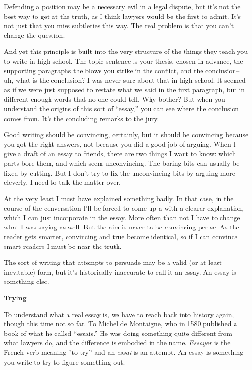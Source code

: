 Defending a position may be a necessary evil in a legal dispute, but
it's not the best way to get at the truth, as I think lawyers would be
the first to admit. It's not just that you miss subtleties this way. The
real problem is that you can't change the question.

And yet this principle is built into the very structure of the things
they teach you to write in high school. The topic sentence is your
thesis, chosen in advance, the supporting paragraphs the blows you
strike in the conflict, and the conclusion-- uh, what is the conclusion?
I was never sure about that in high school. It seemed as if we were just
supposed to restate what we said in the first paragraph, but in
different enough words that no one could tell. Why bother? But when you
understand the origins of this sort of ``essay,'' you can see where the
conclusion comes from. It's the concluding remarks to the jury.

Good writing should be convincing, certainly, but it should be
convincing because you got the right answers, not because you did a good
job of arguing. When I give a draft of an essay to friends, there are
two things I want to know: which parts bore them, and which seem
unconvincing. The boring bits can usually be fixed by cutting. But I
don't try to fix the unconvincing bits by arguing more cleverly. I need
to talk the matter over.

At the very least I must have explained something badly. In that case,
in the course of the conversation I'll be forced to come up a with a
clearer explanation, which I can just incorporate in the essay. More
often than not I have to change what I was saying as well. But the aim
is never to be convincing per se. As the reader gets smarter, convincing
and true become identical, so if I can convince smart readers I must be
near the truth.

The sort of writing that attempts to persuade may be a valid (or at
least inevitable) form, but it's historically inaccurate to call it an
essay. An essay is something else.

\textbf{Trying}

To understand what a real essay is, we have to reach back into history
again, though this time not so far. To Michel de Montaigne, who in 1580
published a book of what he called ``essais.'' He was doing something
quite different from what lawyers do, and the difference is embodied in
the name. \emph{Essayer} is the French verb meaning ``to try'' and an
\emph{essai} is an attempt. An essay is something you write to try to
figure something out.

